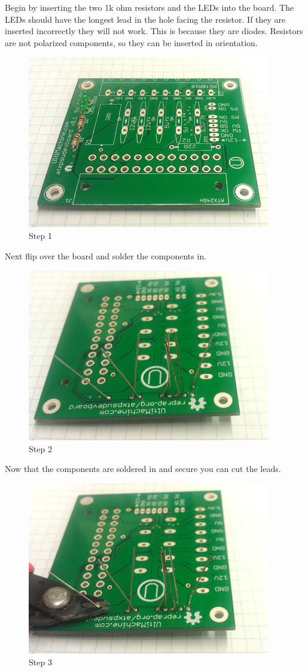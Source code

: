 Begin by inserting the two 1k ohm resistors and the LEDs into the board.
The LEDs should have the longest lead in the hole facing the resistor.
If they are inserted incorrectly they will not work. This is because
they are diodes. Resistors are not polarized components, so they can be
inserted in orientation.

\begin{figure}[H]
\centering
\includegraphics{./png/step-01.png}
\caption{Step 1}
\end{figure}

Next flip over the board and solder the components in.

\begin{figure}[H]
\centering
\includegraphics{./png/step-02.png}
\caption{Step 2}
\end{figure}

Now that the components are soldered in and secure you can cut the
leads.

\begin{figure}[H]
\centering
\includegraphics{./png/step-03.png}
\caption{Step 3}
\end{figure}

